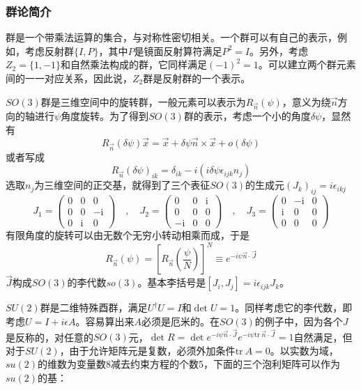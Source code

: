 \documentclass[a4paper,11pt]{ctexart}
\newcommand{\beq}{\begin{equation}}
\newcommand{\eeq}{\end{equation}}
\newcommand{\tr}{\mathrm{tr \ }}
\begin{document}
\subsubsection{群论简介}
群是一个带乘法运算的集合，与对称性密切相关。一个群可以有自己的表示，例如，考虑反射群$\{ I,P \}$，其中$P$是镜面反射算符满足$P^2 = I$。另外，考虑$Z_2 = \{ 1, -1\}$和自然乘法构成的群，它同样满足$(-1)^2 = 1$。可以建立两个群元素间的一一对应关系，因此说，$Z_2$群是反射群的一个表示。
\par
$SO(3)$群是三维空间中的旋转群，一般元素可以表示为$R_{\vec{n}} (\psi)$，意义为绕$\vec{n}$方向的轴进行$\psi$角度旋转。为了得到$SO(3)$群的表示，考虑一个小的角度$\delta \psi$，显然有
\beq
R_{\vec{n}} (\delta \psi) \vec{x}= \vec{x} + \delta \psi \vec{n} \times \vec{x} + o(\delta \psi)
\eeq
或者写成
\beq
R_{\vec{n}} (\delta \psi)_{ik} = \delta_{ik} -i (i \delta \psi \epsilon_{ijk} n_j )
\eeq
选取$n_j$为三维空间的正交基，就得到了三个表征$SO(3)$的生成元$(J_k)_{ij} = i \epsilon_{ikj}$
\beq
J_{1}=\left(\begin{array}{ccc}{0} & {0} & {0} \\ {0} & {0} & {-\mathrm{i}} \\ {0} & {\mathrm{i}} & {0}\end{array}\right) \quad, \quad J_{2}=\left(\begin{array}{ccc}{0} & {0} & {\mathrm{i}} \\ {0} & {0} & {0} \\ {-\mathrm{i}} & {0} & {0}\end{array}\right) \quad, \quad J_{3}=\left(\begin{array}{ccc}{0} & {-\mathrm{i}} & {0} \\ {\mathrm{i}} & {0} & {0} \\ {0} & {0} & {0}\end{array}\right)
\eeq
有限角度的旋转可以由无数个无穷小转动相乘而成，于是
\beq
R_{\vec{n}} (\psi) = \left[ R_{\vec{n}} \left( \frac{\psi}{N} \right) \right]^N \equiv e^{- i \psi \vec{n} \cdot \vec{J}}
\eeq
$\vec{J}$构成$SO(3)$的李代数$so(3)$。基本李括号是$[J_i,J_j] = i\epsilon_{ijk} J_k$。
\par
$SU(2)$群是二维特殊酉群，满足$U^\dagger U = I$和$\det U = 1$。同样考虑它的李代数，即考虑$U = I + i \epsilon A$。容易算出来$A$必须是厄米的。在$SO(3)$的例子中，因为各个$J$是反称的，对任意的$SO(3)$元，$\det R = \det e^{-i \psi \vec{n} \cdot \vec{J} } e^{-i \psi \tr \vec{n} \cdot \vec{J}} = 1$自然满足，但对于$SU(2)$，由于允许矩阵元是复数，必须外加条件$\tr A = 0$。以实数为域，$su(2)$的维数为变量数8减去约束方程的个数5，下面的三个泡利矩阵可以作为$su(2)$的基：
\end{document}
